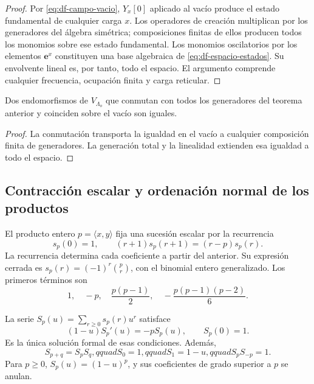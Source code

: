 \begin{proof}
Por \eqref{eq:df-campo-vacio}, \(Y_x[0]\) aplicado al vacío produce
el estado fundamental de cualquier carga \(x\). Los operadores de
creación multiplican por los generadores del álgebra simétrica;
composiciones finitas de ellos producen todos los monomios sobre ese
estado fundamental. Los monomios oscilatorios por los elementos
\(\mathbf e^x\) constituyen una base algebraica de
\eqref{eq:df-espacio-estados}. Su envolvente lineal es, por tanto, todo
el espacio. El argumento comprende cualquier frecuencia, ocupación
finita y carga reticular.
\end{proof}

\begin{corollary}
Dos endomorfismos de \(V_{\Lambda_o}\) que conmutan con todos los
generadores del teorema anterior y coinciden sobre el vacío son iguales.
\end{corollary}

\begin{proof}
La conmutación transporta la igualdad en el vacío a cualquier
composición finita de generadores. La generación total y la linealidad
extienden esa igualdad a todo el espacio.
\end{proof}

\subsection{Contracción escalar y ordenación normal de los productos}
\label{subsec:df-contraccion}


El producto entero \(p=\langle x,y\rangle\) fija una sucesión escalar
por la recurrencia
\begin{equation}
 s_p(0)=1,\qquad
 (r+1)s_p(r+1)=(r-p)s_p(r).
 \label{eq:df-contraccion-recurrencia}
\end{equation}
La recurrencia determina cada coeficiente a partir del anterior. Su
expresión cerrada es
\(s_p(r)=(-1)^r\binom pr\), con el binomial entero generalizado.
Los primeros términos son
\[
 1,\quad -p,\quad \frac{p(p-1)}2,\quad
 -\frac{p(p-1)(p-2)}6.
\]

\begin{proposition}
\label{prop:df-factor-contraccion}
La serie \(S_p(u)=\sum_{r\geq0}s_p(r)u^r\) satisface
\begin{equation}
 (1-u)S_p'(u)=-pS_p(u),\qquad S_p(0)=1.
 \label{eq:df-ecuacion-factor}
\end{equation}
Es la única solución formal de esas condiciones. Además,
\[
 S_{p+q}=S_pS_q,qquad S_0=1,qquad S_1=1-u,qquad
 S_pS_{-p}=1.
\]
Para \(p\geq0\), \(S_p(u)=(1-u)^p\), y sus coeficientes de grado
superior a \(p\) se anulan.
\end{proposition}


